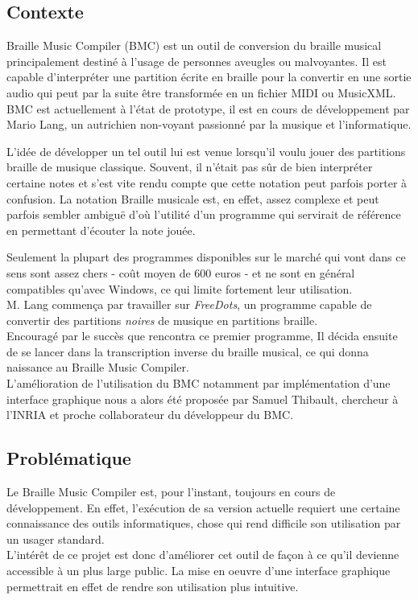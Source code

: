 \subsection*{Contexte}
Braille Music Compiler (BMC) est un outil de conversion du braille musical principalement destiné à l'usage de personnes aveugles ou malvoyantes. Il est capable d'interpréter une partition écrite en braille pour la convertir en une sortie audio qui peut par la suite être transformée en un fichier  MIDI ou MusicXML.\\

  BMC est actuellement à l'état de prototype, il est en cours de développement par Mario Lang, un autrichien non-voyant passionné par la musique et l'informatique.

  L'idée de développer un tel outil lui est venue lorsqu'il voulu jouer des partitions braille de musique classique. Souvent, il n'était pas sûr de bien interpréter certaine notes et s'est vite rendu compte que cette notation peut parfois porter à confusion. La notation Braille musicale est, en effet, assez complexe et peut parfois sembler ambiguë d'où l'utilité d'un programme qui servirait de référence en permettant d'écouter la note jouée. 
  
  Seulement la plupart des programmes disponibles sur le marché qui vont dans ce sens sont assez chers - coût moyen de 600 euros - et ne sont en général compatibles qu'avec Windows, ce qui limite fortement leur utilisation.\\
 
  M. Lang commença par travailler sur \textit{FreeDots}, un programme capable de convertir des partitions \textit{noires} de musique en partitions braille.\\
  Encouragé par le succès que rencontra ce premier programme, Il décida ensuite de se lancer dans la transcription inverse du braille musical, ce qui donna naissance au Braille Music Compiler. \\
  
  L'amélioration de l'utilisation du BMC notamment par implémentation d'une interface graphique nous a alors été proposée par Samuel Thibault, chercheur à l'INRIA et proche collaborateur du développeur du BMC. 
  
  
 
\subsection*{Problématique}
Le Braille Music Compiler est, pour l'instant, toujours en cours de développement. En effet, l'exécution de sa version actuelle requiert une certaine connaissance des outils informatiques, chose qui rend difficile son utilisation par un usager standard.\\
L'intérêt de ce projet est donc d'améliorer cet outil de façon à ce qu'il devienne accessible à un plus large public. La mise en oeuvre d'une interface graphique permettrait en effet de rendre son utilisation plus intuitive.\\

